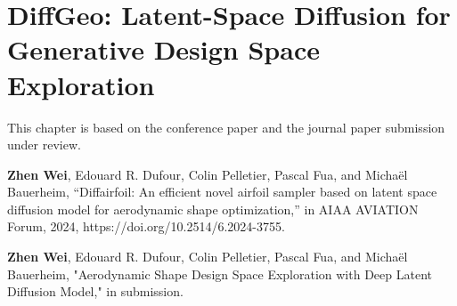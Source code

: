 \chapter{DiffGeo: Latent-Space Diffusion for Generative Design Space Exploration}
\label{ch6}

This chapter is based on the conference paper \cite{aa.Wei2024} and the journal paper submission under review.

\textbf{Zhen Wei}, Edouard R. Dufour, Colin Pelletier, Pascal Fua, and Michaël Bauerheim, “Diffairfoil: An efficient novel airfoil sampler based on latent space diffusion model for aerodynamic shape optimization,” in AIAA AVIATION Forum, 2024, https://doi.org/10.2514/6.2024-3755.

\textbf{Zhen Wei}, Edouard R. Dufour, Colin Pelletier, Pascal Fua, and Michaël Bauerheim, "Aerodynamic Shape Design Space Exploration with Deep Latent Diffusion Model," in submission.


